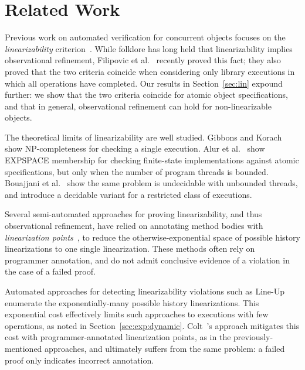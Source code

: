 \section{Related Work}


Previous work on automated verification for concurrent objects focuses on the
\emph{linearizability} criterion~\citep{journals/toplas/HerlihyW90}. While
folklore has long held that linearizability implies observational refinement,
Filipovic et al.~\cite{journals/tcs/FilipovicORY10} recently proved this fact;
they also proved that the two criteria coincide when considering only library
executions in which all operations have completed. Our results in
Section~\ref{sec:lin} expound further: we show that the two criteria coincide
for atomic object specifications, and that in general, observational refinement
can hold for non-linearizable objects.

The theoretical limits of linearizability are well studied. Gibbons
and Korach~\cite{journals/siamcomp/GibbonsK97} show NP-completeness for
checking a single execution. Alur et al.~\cite{journals/iandc/AlurMP00} show
EXPSPACE membership for checking finite-state implementations against atomic
specifications, but only when the number of program threads is bounded.
Bouajjani et al.~\cite{conf/esop/BouajjaniEEH13} show the same problem is
undecidable with unbounded threads, and introduce a decidable variant for a
restricted class of executions.


Several semi-automated approaches for proving linearizability, and thus
observational refinement, have relied on annotating method bodies with
\emph{linearization points}~\cite{conf/cav/AmitRRSY07, conf/fm/LiuCLS09,
conf/podc/OHearnRVYY10, conf/cav/Vafeiadis10, conf/icse/Zhang11a}, to reduce the otherwise-exponential
space of possible history linearizations to one single linearization. These
methods often rely on programmer annotation, and do not admit conclusive
evidence of a violation in the case of a failed proof.

Automated approaches for detecting linearizability violations such as
Line-Up~\cite{conf/pldi/BurckhardtDMT10} enumerate the exponentially-many
possible history linearizations. This exponential cost effectively limits such
approaches to executions with few operations, as noted in
Section~\ref{sec:exp:dynamic}. Colt~\cite{conf/oopsla/ShachamBASVY11}'s
approach mitigates this cost with programmer-annotated linearization points, as
in the previously-mentioned approaches, and ultimately suffers from the same
problem: a failed proof only indicates incorrect annotation.